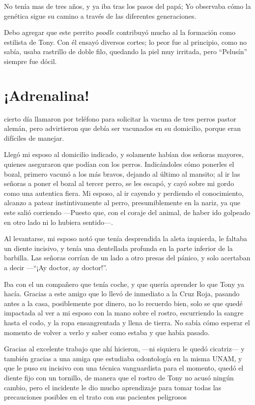 \documentclass[letterpaper, 12pt]{book}
\begin{document}
No tenía mas de tres años, y ya iba tras los pasos del papá; Yo observaba cómo la genética sigue su camino a través de las diferentes generaciones.

Debo agregar que este perrito \textit{poodle} contribuyó mucho  al la formación como estilista de Tony. Con él ensayó diversos cortes; lo peor fue al principio, como no sabía, usaba rastrillo de doble filo, quedando la piel muy irritada, pero ``Pelusín'' siempre fue dócil.

\chapter{¡Adrenalina!}
cierto día llamaron por teléfono para solicitar la vacuna de tres perros pastor alemán, pero advirtieron que debía ser vacunados en su domicilio, porque eran difíciles de manejar.

Llegó mi esposo al domicilio indicado, y solamente habían dos señoras mayores, quienes aseguraron que podían con los perros. Indicándoles cómo ponerles el bozal, primero vacunó a los más bravos, dejando al último al mansito; al ir las señoras a poner el bozal al tercer perro, se les escapó, y cayó sobre mi gordo como una autentica fiera. Mi esposo, al ir cayendo y perdiendo el conocimiento, alcanzo a patear instintivamente al perro, presumiblemente en la nariz, ya que este salió corriendo ---Puesto que, con el coraje del animal, de haber ido golpeado en otro lado ni lo hubiera sentido---. 

 Al levantarse, mi esposo notó que tenía desprendida la aleta izquierda, le faltaba un diente incisivo, y tenía una dentellada profunda en la parte inferior de la barbilla. Las señoras corrían de un lado a otro presas del pánico, y solo acertaban a decir ---``¡Ay doctor, ay doctor!''.

Iba con el un compañero que tenía coche, y que quería aprender lo que Tony ya hacía. Gracias a este amigo que lo llevó de inmediato a la Cruz Roja, pasando antes a la casa, posiblemente por dinero, no lo recuerdo bien, solo se que quedé impactada al ver a mi esposo con la mano sobre el rostro, escurriendo la sangre hasta el codo, y la ropa ensangrentada y llena de tierra.
No sabía cómo esperar el momento de volver a verlo y saber como estaba y que había pasado.

Gracias al excelente trabajo que ahí hicieron, ---ni siquiera le quedó cicatriz--- y también gracias a una amiga que estudiaba odontología en la misma UNAM, y que le puso su incisivo con una técnica vanguardista para el momento, quedó el diente fijo con un tornillo, de manera que el rostro de Tony no acusó ningún  cambio, pero el incidente le dio mucho aprendizaje para tomar todas las precauciones posibles en el trato con sus pacientes peligrosos
\end{document}
